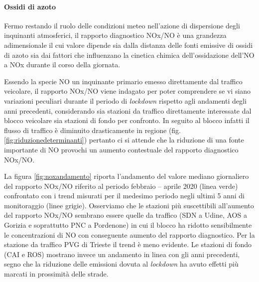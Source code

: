 
\FloatBarrier
\paragraph{Ossidi di azoto}\label{cap:noxno}

Fermo restando il ruolo delle condizioni meteo nell’azione di dispersione degli inquinanti atmosferici, il rapporto diagnostico NOx/NO è una grandezza adimensionale il cui valore dipende sia dalla distanza delle fonti emissive di ossidi di azoto sia dai fattori che influenzano la   cinetica chimica dell’ossidazione dell’NO a NOx durante il corso della giornata.

Essendo la specie NO un inquinante primario emesso direttamente dal traffico veicolare, il rapporto NOx/NO viene indagato per poter comprendere se vi siano variazioni peculiari durante il periodo di \textit{lockdown} rispetto agli andamenti degli anni precedenti, considerando sia stazioni da traffico direttamente interessate dal blocco veicolare sia stazioni di fondo per confronto.
In seguito al blocco infatti il flusso di traffico è diminuito drasticamente in regione (fig.\ref{fig:riduzionedeterminanti}) pertanto ci si attende che la riduzione di una fonte importante di NO provochi un aumento contestuale del rapporto diagnostico NOx/NO.

La figura \ref{fig:noxandamento} riporta l’andamento del valore mediano giornaliero del rapporto NOx/NO riferito al periodo febbraio -- aprile 2020 (linea verde) confrontato con i trend misurati per il medesimo periodo negli ultimi 5 anni di monitoraggio (linee grigie).
Osserviamo che le stazioni più suscettibili all’aumento del rapporto NOx/NO sembrano essere quelle da traffico (SDN a Udine, AOS a Gorizia e soprattutto PNC a Pordenone) in cui il blocco ha ridotto sensibilmente le concentrazioni di NO con conseguente aumento  del rapporto diagnostico. Per la stazione da traffico PVG di Trieste il trend è meno evidente.
Le stazioni di fondo (CAI e ROS) mostrano invece un andamento in linea con gli anni precedenti, segno che la riduzione delle emissioni dovuta al \textit{lockdown} ha avuto effetti più marcati in prossimità delle strade.

